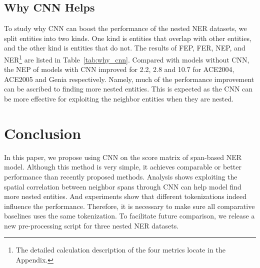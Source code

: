 \documentclass[11pt]{article}
\begin{document}
\begin{table*}[!ht]
\subsection{Why CNN Helps} \label{sec:why_cnn_help}
To study why CNN can boost the performance of the nested NER datasets, we split entities into two kinds. One kind is entities that overlap with other entities, and the other kind is entities that do not. The results of FEP, FER, NEP, and NER\footnote{The detailed calculation description of the four metrics locate in the Appendix.} are listed in Table~\ref{tab:why_cnn}. Compared with models without CNN, the NEP of models with CNN improved for 2.2, 2.8 and 10.7 for ACE2004, ACE2005 and Genia respectively. Namely, much of the performance improvement can be ascribed to finding more nested entities. This is expected as the CNN can be more effective for exploiting the neighbor entities when they are nested.



\section{Conclusion}
In this paper, we propose using CNN on the score matrix of span-based NER model. Although this method is very simple, it achieves comparable or better performance than recently proposed methods. Analysis shows exploiting the spatial correlation between neighbor spans through CNN can help model find more nested entities. And experiments show that different tokenizations indeed influence the performance. Therefore, it is necessary to make sure all comparative baselines uses the same tokenization. To facilitate future comparison, we release a new pre-processing script for three nested NER datasets. 







\appendix



\end{table*}
\end{document}
